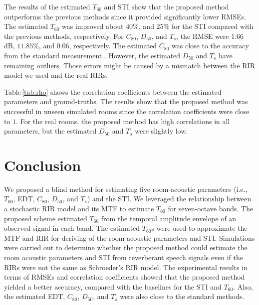 \documentclass[conference]{IEEEtran}
\begin{document}
	The results of the estimated $T_{60}$ and STI show that the proposed method outperforms the previous methods since it provided significantly lower RMSEs. The estimated $T_{60}$ was improved about $40\%$, and $25\%$ for the STI compared with the previous methods, respectively. For $C_{80}$, $D_{50}$, and $T_s$, the RMSE were $1.66$ dB, $11.85\%$, and $0.06$, respectively. The estimated $C_{80}$ was close to the accuracy from the standard measurement \cite{ISO3381}. However, the estimated $D_{50}$ and $T_s$ have remaining outliers. Those errors might be caused by a mismatch between the RIR model we used and the real RIRs. 
	
	Table\,\ref{tab:rho} shows the correlation coefficients between the estimated parameters and ground-truths. The results show that the proposed method was successful in unseen simulated rooms since the correlation coefficients were close to $1$. For the real rooms, the proposed method has high correlations in all parameters, but the estimated $D_{50}$ and $T_s$ were slightly low.
	
	\section{Conclusion}
	We proposed a blind method for estimating five room-acoustic parameters (i.e., $T_{60}$, EDT, $C_{80}$, $D_{50}$, and $T_s$) and the STI. We leveraged the relationship between a stochastic RIR model and its MTF to estimate $T_{60}$ for seven-octave bands. The proposed scheme estimated $T_{60}$ from the temporal amplitude envelope of an observed signal in each band. The estimated $T_{60}$s were used to approximate the MTF and RIR for deriving of the room acoustic parameters and STI. Simulations were carried out to determine whether the proposed method could estimate the room acoustic parameters and STI from reverberant speech signals even if the RIRs were not the same as Schroeder's RIR model. The experimental results in terms of RMSEs and correlation coefficients showed that the proposed method yielded a better accuracy, compared with the baselines for the STI and $T_{60}$. Also, the estimated EDT, $C_{80}$, $D_{50}$, and $T_s$ were also close to the standard methods.
	
\end{document}
